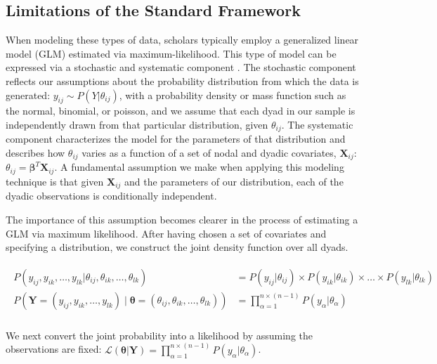 \subsection{Limitations of the Standard Framework}

When modeling these types of data, scholars typically employ a generalized linear model (GLM) estimated via maximum-likelihood. This type of model can be expressed via a stochastic and systematic component \citep{pawitan:2013}. The stochastic component reflects our assumptions about the probability distribution from which the data is generated: $y_{ij} \sim P(Y | \theta_{ij})$, with a probability density or mass function such as the normal, binomial, or poisson, and we assume that each dyad in our sample is independently drawn from that particular distribution, given $\theta_{ij}$. The systematic component characterizes the model for the parameters of that distribution and describes how $\theta_{ij}$ varies as a function of a set of nodal and dyadic covariates, $\mathbf{X}_{ij}$: $\theta_{ij} = \bm\beta^{T} \mathbf{X}_{ij}$. A fundamental assumption we make when applying this modeling technique is that given $\mathbf{X}_{ij}$ and the parameters of our distribution, each of the dyadic observations is conditionally independent. 

The importance of this assumption becomes clearer in the process of estimating a GLM via maximum likelihood. After having chosen a set of covariates and specifying a distribution, we construct the joint density function over all dyads.

\vspace{-8mm}
\begin{align}
\begin{aligned}
	P(y_{ij}, y_{ik}, \ldots, y_{lk} | \theta_{ij}, \theta_{ik}, \ldots, \theta_{lk}) &= P(y_{ij} | \theta_{ij}) \times P(y_{ik} | \theta_{ik}) \times \ldots \times P(y_{lk} | \theta_{lk}) \\
	P(\mathbf{Y}=(y_{ij}, y_{ik}, \ldots, y_{lk}) \; | \; \bm{\theta}=(\theta_{ij}, \theta_{ik}, \ldots, \theta_{lk})) &= \prod_{\alpha=1}^{n \times (n-1)} P(y_{\alpha} | \theta_{\alpha})  \\
\end{aligned}
\end{align}

We next convert the joint probability into a likelihood by assuming the observations are fixed: $\displaystyle \mathcal{L} (\bm{\theta} | \mathbf{Y}) = \prod_{\alpha=1}^{n \times (n-1)} P(y_{\alpha} | \theta_{\alpha})$.

